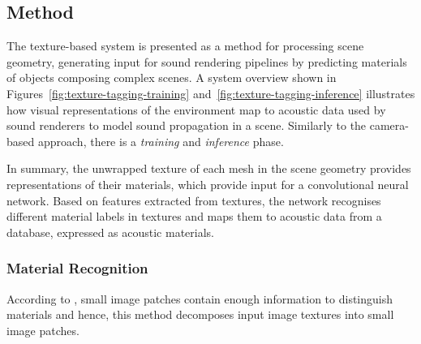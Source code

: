 \subsection{Method}
The texture-based system is presented as a method for processing scene geometry, generating input for sound rendering pipelines by predicting materials of objects composing complex scenes. A system overview shown in Figures~\ref{fig:texture-tagging-training} and~\ref{fig:texture-tagging-inference} illustrates how visual representations of the environment map to acoustic data used by sound renderers to model sound propagation in a scene. Similarly to the camera-based approach, there is a \emph{training} and \emph{inference} phase.\par
In summary, the unwrapped texture of each mesh in the scene geometry provides representations of their materials, which provide input for a convolutional neural network. Based on features extracted from textures, the network recognises different material labels in textures and maps them to acoustic data from a database, expressed as acoustic materials.\par

\subsubsection{Material Recognition}
According to \cite{schwartz2019recognizing}, small image patches contain enough information to distinguish materials and hence, this method decomposes input image textures into small image patches.
